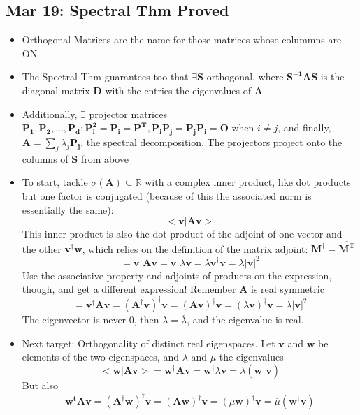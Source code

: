 \documentclass[10pt, oneside]{article}
\newcommand{\R}{\mathbb{R}}
\renewcommand{\vec}[1]{\mathbf{#1}}
\newcommand{\mat}[1]{\mathbf{#1}}
\begin{document}
\subsection{Mar 19: Spectral Thm Proved}
\begin{itemize}
    \item Orthogonal Matrices are the name for those matrices whose colummns are ON
    \item The Spectral Thm guarantees too that $\exists \mat{S}$ orthogonal, where $\mat{S^{-1}}\mat{A}\mat{S}$ is the diagonal matrix $\mat{D}$ with the entries the eigenvalues of $\mat{A}$
    \item Additionally, $\exists$ projector matrices $\mat{P_1},\mat{P_2}, \hdots ,\mat{P_d} : \mat{P_i^2} = \mat{P_i} = \mat{P^T}, \mat{P_i}\mat{P_j} = \mat{P_j}\mat{P_i} = \mat{O}$ when $i \neq j$, and finally, $\mat{A} = \sum_j \lambda_j \mat{P_j}$, the spectral decomposition. The projectors project onto the columns of $\mat{S}$ from above
    \item To start, tackle $\sigma(\mat{A}) \subseteq \R$ with a complex inner product, like dot products but one factor is conjugated (because of this the associated norm is essentially the same):
            \[<\vec{v}|\mat{A}\vec{v}>\]
        This inner product is also the dot product of the adjoint of one vector and the other $\vec{v}^\dagger \vec{w}$, which relies on the definition of the matrix adjoint: $\mat{M^\dagger} = \overline{\mat{M^T}}$
            \[= \vec{v^\dagger} \mat{A}\vec{v} = \vec{v^\dagger} \lambda\vec{v} = \lambda \vec{v^\dagger}\vec{v} = \lambda |\vec{v}|^2\]
        Use the associative property and adjoints of products on the expression, though, and get a different expression! Remember $\mat{A}$ is real symmetric
            \[= \vec{v^\dagger} \mat{A}\vec{v} = (\mat{A^\dagger} \vec{v})^\dagger \vec{v} = (\mat{A}\vec{v})^\dagger \vec{v} = (\lambda \vec{v})^\dagger \vec{v} = \overline{\lambda} |\vec{v}|^2\]
        The eigenvector is never $0$, then $\lambda = \overline{\lambda}$, and the eigenvalue is real.
    \item Next target: Orthogonality of distinct real eigenspaces. Let $\vec{v}$ and $\vec{w}$ be elements of the two eigenspaces, and $\lambda$ and $\mu$ the eigenvalues
            \[<\vec{w}|\mat{A}\vec{v}> = \vec{w^\dagger}\mat{A}\vec{v} = \vec{w^\dagger}\lambda \vec{v} = \lambda (\vec{w}^\dagger \vec{v})\]
        But also
            \[\vec{w^t} \mat{A}\vec{v} =  (\mat{A^\dagger}\vec{w})^\dagger \vec{v} = (\mat{A}\vec{w})^\dagger \vec{v} = (\mu \vec{w})^\dagger \vec{v} = \overline{\mu}(\vec{w}^\dagger \vec{v})\]

\end{itemize}
\end{document}
